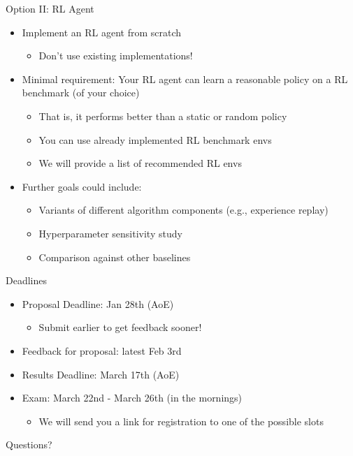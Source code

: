 \documentclass[aspectratio=169]{../latex_main/tntbeamer}  %
\begin{document}
\begin{frame}[c]{Option II: RL Agent}
	
	\begin{itemize}
		\item Implement an RL agent from scratch
		\begin{itemize}
			\item Don't use existing implementations!
		\end{itemize}
		\item Minimal requirement: Your RL agent can learn a reasonable policy on a RL benchmark (of your choice)
		\begin{itemize}
			\item That is, it performs better than a static or random policy
			\item You can use already implemented RL benchmark envs
			\item We will provide a list of recommended RL envs
		\end{itemize}
		\item Further goals could include:
		\begin{itemize}
			\item Variants of different algorithm components (e.g., experience replay)
			\item Hyperparameter sensitivity study
			\item Comparison against other baselines
		\end{itemize}
	\end{itemize}
	
\end{frame}
\begin{frame}[c]{Deadlines}
	
	\begin{itemize}
		\item Proposal Deadline: Jan 28th (AoE) 
		\begin{itemize}
			\item Submit earlier to get feedback sooner!
		\end{itemize}
		\item Feedback for proposal: latest Feb 3rd
		\item Results Deadline: March 17th (AoE) 
		\item Exam: March 22nd - March 26th (in the mornings)
		\begin{itemize}
			\item We will send you a link for registration to one of the possible slots
		\end{itemize}
	\end{itemize}
	
\end{frame}


\begin{frame}[c]{}
	
	\centering
	\huge
	Questions?
	
\end{frame}


\end{document}

